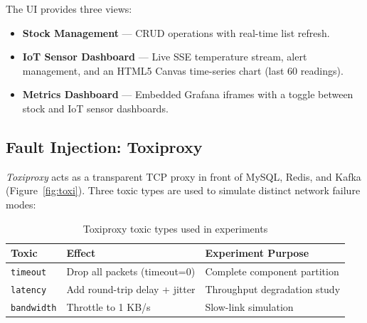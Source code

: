\documentclass[12pt,a4paper,twoside]{article}
\newcommand{\tech}[1]{\textit{#1}}
\begin{document}
The UI provides three views:
\begin{itemize}[noitemsep]
  \item \textbf{Stock Management} — CRUD operations with real-time list refresh.
  \item \textbf{IoT Sensor Dashboard} — Live SSE temperature stream, alert
        management, and an HTML5 Canvas time-series chart (last 60 readings).
  \item \textbf{Metrics Dashboard} — Embedded Grafana iframes with a
        toggle between stock and IoT sensor dashboards.
\end{itemize}

\subsection{Fault Injection: Toxiproxy}

\tech{Toxiproxy} acts as a transparent TCP proxy in front of MySQL,
Redis, and Kafka (Figure~\ref{fig:toxi}).
Three toxic types are used to simulate distinct network failure modes:

\begin{table}[H]
\centering
\caption{Toxiproxy toxic types used in experiments}
\label{tab:toxics}
\begin{tabularx}{\textwidth}{@{}llX@{}}
\toprule
\textbf{Toxic}     & \textbf{Effect} & \textbf{Experiment Purpose} \\
\midrule
\texttt{timeout}   & Drop all packets (timeout=0) & Complete component partition \\
\texttt{latency}   & Add round-trip delay + jitter & Throughput degradation study \\
\texttt{bandwidth} & Throttle to 1 KB/s & Slow-link simulation \\
\bottomrule
\end{tabularx}
\end{table}
\end{document}
